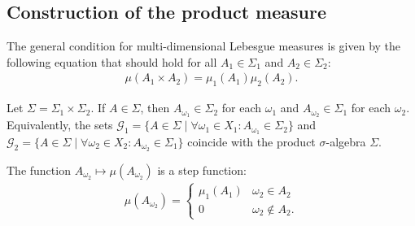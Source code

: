 \subsection{Construction of the product measure}

    The general condition for multi-dimensional Lebesgue measures is given by the following equation that should hold for all $A_1\in\Sigma_1$ and $A_2\in\Sigma_2$:
    \begin{gather}
        \label{lebesgue:general_condition}
        \mu(A_1\times A_2) = \mu_1(A_1)\mu_2(A_2).
    \end{gather}

    \begin{property}
        Let $\Sigma = \Sigma_1\times\Sigma_2$. If $A\in\Sigma$, then $A_{\omega_1}\in\Sigma_2$ for each $\omega_1$ and $A_{\omega_2}\in\Sigma_1$ for each $\omega_2$. Equivalently, the sets $\mathcal{G}_1 = \{A\in\Sigma\mid\forall\omega_1\in X_1:A_{\omega_1}\in\Sigma_2\}$ and $\mathcal{G}_2 = \{A\in\Sigma\mid\forall\omega_2\in X_2: A_{\omega_2}\in\Sigma_1\}$ coincide with the product $\sigma$-algebra $\Sigma$.
    \end{property}

    \begin{property}
        The function $A_{\omega_2}\mapsto\mu(A_{\omega_2})$ is a step function:
        \begin{gather*}
            \mu(A_{\omega_2}) =
            \begin{cases}
                \mu_1(A_1)&\omega_2\in A_2\\
                0&\omega_2\not\in A_2.
            \end{cases}
        \end{gather*}
    \end{property}

